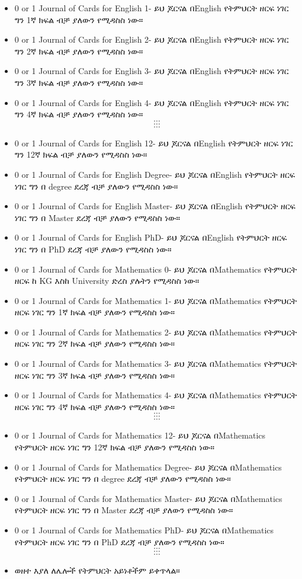 \documentclass[a4paper,12pt]{article}
\begin{document}
\begin{itemize}
\item {\color{red}0 or 1 Journal of Cards for English 1}- ይህ ጆርናል በEnglish የትምህርት ዘርፍ ነገር ግን 1ኛ ክፍል ብቻ ያለውን የሚዳስስ ነው።
\item {\color{red}0 or 1 Journal of Cards for English 2}- ይህ ጆርናል በEnglish የትምህርት ዘርፍ ነገር ግን 2ኛ ክፍል ብቻ ያለውን የሚዳስስ ነው።
\item {\color{red}0 or 1 Journal of Cards for English 3}- ይህ ጆርናል በEnglish የትምህርት ዘርፍ ነገር ግን 3ኛ ክፍል ብቻ ያለውን የሚዳስስ ነው።
\item {\color{red}0 or 1 Journal of Cards for English 4}- ይህ ጆርናል በEnglish የትምህርት ዘርፍ ነገር ግን 4ኛ ክፍል ብቻ ያለውን የሚዳስስ ነው።
$$\cdots$$
$$\cdots$$
$$\cdots$$
\item {\color{red}0 or 1 Journal of Cards for English 12}- ይህ ጆርናል በEnglish የትምህርት ዘርፍ ነገር ግን 12ኛ ክፍል ብቻ ያለውን የሚዳስስ ነው።
\item {\color{red}0 or 1 Journal of Cards for English Degree}- ይህ ጆርናል በEnglish የትምህርት ዘርፍ ነገር ግን በ degree ደረጃ ብቻ ያለውን የሚዳስስ ነው።
\item {\color{red}0 or 1 Journal of Cards for English Master}- ይህ ጆርናል በEnglish የትምህርት ዘርፍ ነገር ግን በ Master ደረጃ ብቻ ያለውን የሚዳስስ ነው።
\item {\color{red}0 or 1 Journal of Cards for English PhD}- ይህ ጆርናል በEnglish የትምህርት ዘርፍ ነገር ግን በ PhD ደረጃ ብቻ ያለውን የሚዳስስ ነው።
\item {\color{red}0 or 1 Journal of Cards for Mathematics 0}- ይህ ጆርናል በMathematics የትምህርት ዘርፍ ከ KG እስከ University ድረስ ያሉትን የሚዳስስ ነው።
\item {\color{red}0 or 1 Journal of Cards for Mathematics 1}- ይህ ጆርናል በMathematics የትምህርት ዘርፍ ነገር ግን 1ኛ ክፍል ብቻ ያለውን የሚዳስስ ነው።
\item {\color{red}0 or 1 Journal of Cards for Mathematics 2}- ይህ ጆርናል በMathematics የትምህርት ዘርፍ ነገር ግን 2ኛ ክፍል ብቻ ያለውን የሚዳስስ ነው።
\item {\color{red}0 or 1 Journal of Cards for Mathematics 3}- ይህ ጆርናል በMathematics የትምህርት ዘርፍ ነገር ግን 3ኛ ክፍል ብቻ ያለውን የሚዳስስ ነው።
\item {\color{red}0 or 1 Journal of Cards for Mathematics 4}- ይህ ጆርናል በMathematics የትምህርት ዘርፍ ነገር ግን 4ኛ ክፍል ብቻ ያለውን የሚዳስስ ነው።
$$\cdots$$
$$\cdots$$
$$\cdots$$
\item {\color{red}0 or 1 Journal of Cards for Mathematics 12}- ይህ ጆርናል በMathematics የትምህርት ዘርፍ ነገር ግን 12ኛ ክፍል ብቻ ያለውን የሚዳስስ ነው።
\item {\color{red}0 or 1 Journal of Cards for Mathematics Degree}- ይህ ጆርናል በMathematics የትምህርት ዘርፍ ነገር ግን በ degree ደረጃ ብቻ ያለውን የሚዳስስ ነው።
\item {\color{red}0 or 1 Journal of Cards for Mathematics Master}- ይህ ጆርናል በMathematics የትምህርት ዘርፍ ነገር ግን በ Master ደረጃ ብቻ ያለውን የሚዳስስ ነው።
\item {\color{red}0 or 1 Journal of Cards for Mathematics PhD}- ይህ ጆርናል በMathematics የትምህርት ዘርፍ ነገር ግን በ PhD ደረጃ ብቻ ያለውን የሚዳስስ ነው።
$$\cdots$$
$$\cdots$$
$$\cdots$$
\item ወዘተ እያለ ለሌሎች የትምህርት አይነቶችም ይቀጥላል።
\end{itemize}
\end{document}
